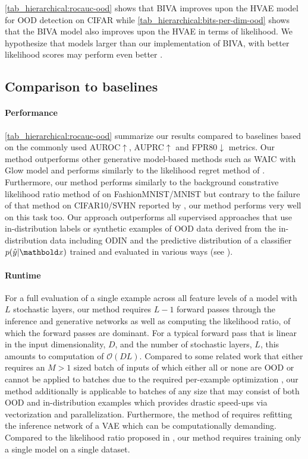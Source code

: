 {\cref{tab_hierarchical:rocauc-ood} shows that BIVA improves upon the HVAE model for OOD detection on CIFAR while \cref{tab_hierarchical:bits-per-dim-ood} shows that the BIVA model also improves upon the HVAE in terms of likelihood.
We hypothesize that models larger than our implementation of BIVA, with better likelihood scores may perform even better \cite{maaloe_biva_2019, vahdat_nvae_2020, child_very_2021}.


\subsection{Comparison to baselines}
\paragraph{Performance} \cref{tab_hierarchical:rocauc-ood} summarize our results compared to baselines based on the commonly used AUROC$\uparrow$, AUPRC$\uparrow$ and FPR80$\downarrow$ metrics.
Our method outperforms other generative model-based methods such as WAIC \cite{choi_waic_2019} with Glow model and performs similarly to the likelihood regret method of \cite{xiao_likelihood_2020}.
Furthermore, our method performs similarly to the background constrative likelihood ratio method of \textcite{ren_likelihood_2019} on FashionMNIST/MNIST but contrary to the failure of that method on CIFAR10/SVHN reported by \cite{xiao_likelihood_2020}, our method performs very well on this task too.
Our approach outperforms all supervised approaches that use in-distribution labels or synthetic examples of OOD data derived from the in-distribution data including ODIN \cite{liang_enhancing_2018} and the predictive distribution of a classifier $p(\hat{y}|\xb)$ trained and evaluated in various ways (see \textcite{ren_likelihood_2019}).

\paragraph{Runtime} For a full evaluation of a single example across all feature levels of a model with $L$ stochastic layers, our method requires $L-1$ forward passes through the inference and generative networks as well as computing the likelihood ratio, of which the forward passes are dominant.
For a typical forward pass that is linear in the input dimensionality, $D$, and the number of stochastic layers, $L$, this amounts to computation of $\mathcal{O}(DL)$.
Compared to some related work that either requires an $M>1$ sized batch of inputs of which either all or none are OOD \cite{nalisnick_detecting_2019} or cannot be applied to batches due to the required per-example optimization \cite{xiao_likelihood_2020}, our method additionally is applicable to batches of any size that may consist of both OOD and in-distribution examples which provides drastic speed-ups via vectorization and parallelization.
Furthermore, the method of \textcite{xiao_fashionmnist_2017} requires refitting the inference network of a VAE which can be computationally demanding.
Compared to the likelihood ratio proposed in \textcite{ren_likelihood_2019}, our method requires training only a single model on a single dataset.


}
